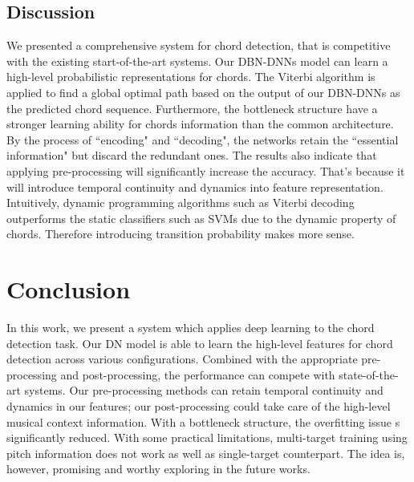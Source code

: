 \documentclass{article}
\begin{document}
\subsection{Discussion}
We presented a comprehensive system for chord detection, that is competitive with the existing start-of-the-art systems. Our DBN-DNNs model can learn a high-level probabilistic representations for chords. The Viterbi algorithm is applied to find a global optimal path based on the output of our DBN-DNNs as the predicted chord sequence. Furthermore, the bottleneck structure have a stronger learning ability for chords information than the common architecture. By the process of ``encoding" and ``decoding", the networks retain the ``essential information" but discard the redundant ones. The results also indicate that applying pre-processing will significantly increase the accuracy. That's because it will introduce temporal continuity and dynamics into feature representation. Intuitively, dynamic programming algorithms such as Viterbi decoding outperforms the static classifiers such as SVMs due to the dynamic property of chords. Therefore introducing transition probability makes more sense. 

\section{Conclusion}
In this work, we present a system which applies deep learning to the chord detection task. Our DN model is able to learn the high-level features for chord detection across various configurations. Combined with the appropriate pre-processing and post-processing, the performance can compete with state-of-the-art systems. Our pre-processing methods can retain temporal continuity and dynamics in our features; our post-processing could take care of the high-level musical context information. With a bottleneck structure, the overfitting issue s significantly reduced. With some practical limitations, multi-target training using pitch information does not work as well as single-target counterpart. The idea is, however, promising and worthy exploring in the future works. 


\end{document}
